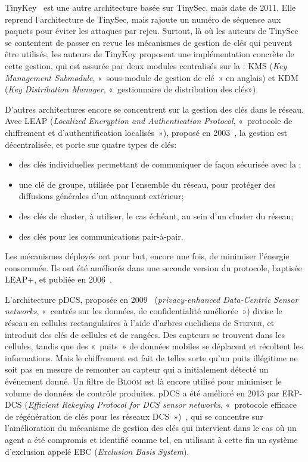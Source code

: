 TinyKey~\cite{CRS11} est une autre architecture basée sur TinySec, mais date de 2011.
Elle reprend l'architecture de TinySec, mais rajoute un numéro de séquence aux paquets pour éviter les attaques par rejeu.
Surtout, là où les auteurs de TinySec se contentent de passer en revue les mécanismes de gestion de clés qui peuvent être utilisés, les auteurs de TinyKey proposent une implémentation concrète de cette gestion, qui est assurée par deux modules centralisés sur la \sdb: KMS (\textit{Key Management Submodule}, « sous-module de gestion de clé » en anglais) et KDM (\textit{Key Distribution Manager}, « gestionnaire de distribution des clés»).

D'autres architectures encore se concentrent sur la gestion des clés dans le réseau.
Avec LEAP (\textit{Localized Encryption and Authentication Protocol}, « protocole de chiffrement et d'authentification localisés »), proposé en 2003~\cite{ZSJ03}, la gestion est décentralisée, et porte sur quatre types de clés:
\begin{itemize}
    \item des clés individuelles permettant de communiquer de façon sécurisée avec la \sdb;
    \item une clé de groupe, utilisée par l'ensemble du réseau, pour protéger des diffusions générales d'un attaquant extérieur;
    \item des clés de cluster, à utiliser, le cas échéant, au sein d'un cluster du réseau;
    \item des clés pour les communications pair-à-pair.
\end{itemize}
Les mécanismes déployés ont pour but, encore une fois, de minimiser l'énergie consommée.
Ils ont été améliorés dans une seconde version du protocole, baptisée LEAP+, et publiée en 2006~\cite{ZSJ06}.

L'architecture pDCS, proposée en 2009~\cite{SZZCY09} (\textit{privacy-enhanced Data-Centric Sensor networks}, « \rcs centrés sur les données, de confidentialité améliorée ») divise le réseau en cellules rectangulaires à l'aide d'arbres euclidiens de \textsc{Steiner}, et introduit des clés de cellules et de rangées.
Des capteurs se trouvent dans les cellules, tandis que des « puits » de données mobiles se déplacent et récoltent les informations.
Mais le chiffrement est fait de telles sorte qu'un puits illégitime ne soit pas en mesure de remonter au capteur qui a initialement détecté un événement donné.
Un filtre de \textsc{Bloom} est là encore utilisé pour minimiser le volume de données de contrôle produites.
pDCS a été amélioré en 2013 par ERP-DCS (\textit{Efficient Rekeying Protocol for DCS sensor networks}, « protocole efficace de régénération de clés pour les réseaux DCS »)~\cite{HYD13}, qui se concentre sur l'amélioration du mécanisme de gestion des clés qui intervient dans le cas où un agent a été compromis et identifié comme tel, en utilisant à cette fin un système d'exclusion appelé EBC (\textit{Exclusion Basis System}).

